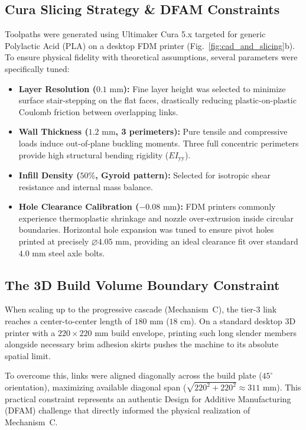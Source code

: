 \documentclass[10pt,twocolumn]{article}
\begin{document}
\subsection{Cura Slicing Strategy \& DFAM Constraints}

Toolpaths were generated using Ultimaker Cura 5.x targeted for generic Polylactic Acid (PLA) on a desktop FDM printer (Fig.~\ref{fig:cad_and_slicing}b). To ensure physical fidelity with theoretical assumptions, several parameters were specifically tuned:
\begin{itemize}
    \item \textbf{Layer Resolution ($0.1\text{ mm}$):} Fine layer height was selected to minimize surface stair-stepping on the flat faces, drastically reducing plastic-on-plastic Coulomb friction between overlapping links.
    \item \textbf{Wall Thickness ($1.2\text{ mm}$, 3 perimeters):} Pure tensile and compressive loads induce out-of-plane buckling moments. Three full concentric perimeters provide high structural bending rigidity ($E I_{\mathrm{yy}}$).
    \item \textbf{Infill Density ($50\%$, Gyroid pattern):} Selected for isotropic shear resistance and internal mass balance.
    \item \textbf{Hole Clearance Calibration ($-0.08\text{ mm}$):} FDM printers commonly experience thermoplastic shrinkage and nozzle over-extrusion inside circular boundaries. Horizontal hole expansion was tuned to ensure pivot holes printed at precisely $\varnothing 4.05\text{ mm}$, providing an ideal clearance fit over standard $4.0\text{ mm}$ steel axle bolts.
\end{itemize}

\subsection{The 3D Build Volume Boundary Constraint}

When scaling up to the progressive cascade (Mechanism~C), the tier-3 link reaches a center-to-center length of $180\text{ mm}$ ($18\text{ cm}$). On a standard desktop 3D printer with a $220 \times 220\text{ mm}$ build envelope, printing such long slender members alongside necessary brim adhesion skirts pushes the machine to its absolute spatial limit. 

To overcome this, links were aligned diagonally across the build plate ($45^\circ$ orientation), maximizing available diagonal span ($\sqrt{220^2 + 220^2} \approx 311\text{ mm}$). This practical constraint represents an authentic Design for Additive Manufacturing (DFAM) challenge that directly informed the physical realization of Mechanism~C.
\end{document}
